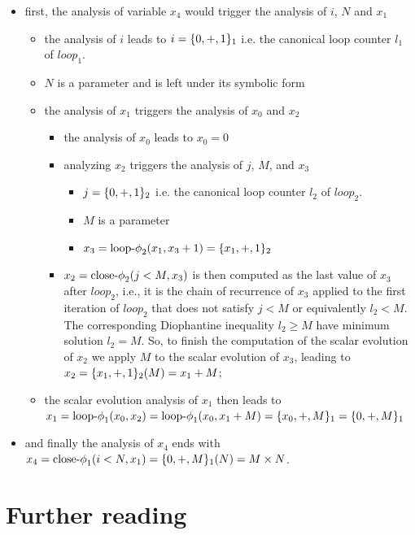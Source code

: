 \begin{itemize}
\item first, the analysis of variable $x_4$ would trigger the analysis
  of $i$, $N$ and $x_1$
  \begin{itemize}
  \item the analysis of $i$ leads to $i = \{0, +, 1\}_1$ i.e. the canonical loop counter $l_1$ of $loop_1$.
  \item $N$ is a parameter and is left under its symbolic form
  \item the analysis of $x_1$ triggers the analysis of $x_0$ and $x_2$
    \begin{itemize}
    \item the analysis of $x_0$ leads to $x_0 = 0$
    \item analyzing $x_2$ triggers the analysis of $j$, $M$, and $x_3$
      \begin{itemize}
      \item $j = \{0, +, 1\}_2$ i.e. the canonical loop counter $l_2$ of $loop_2$.
      \item $M$ is a parameter
      \item $x_3 = \textrm{loop-$\phi$}_2 (x_1, x_3 + 1) = \{x_1, +, 1\}_2$
      \end{itemize}
    \item $x_2 = \textrm{close-$\phi$}_2 (j < M, x_3)$ is then computed as the last value of $x_3$ after
      $loop_2$, i.e., it is the chain of recurrence of $x_3$ applied
      to the first iteration of $loop_2$ that does not satisfy $j < M$ or equivalently $l_2<M$. The corresponding Diophantine inequality $l_2\geq M$  have minimum solution $l_2=M$. So, to finish the computation of the scalar evolution of
      $x_2$ we apply $M$ to the scalar evolution of $x_3$, leading
      to $x_2 = \{x_1, +, 1\}_2 (M) = x_1 + M$;
    \end{itemize}
  \item the scalar evolution analysis of $x_1$ then leads to $x_1 =
    \textrm{loop-$\phi$}_1 (x_0, x_2) = \textrm{loop-$\phi$}_1 (x_0, x_1 + M) = \{x_0, +, M\}_1 =
    \{0, +, M\}_1$
  \end{itemize}
\item and finally the analysis of $x_4$ ends with $x_4 = \textrm{close-$\phi$}_1 (i
  < N, x_1) = \{0, +, M\}_1 (N) = M \times N$.
\end{itemize}


\section{Further reading}

